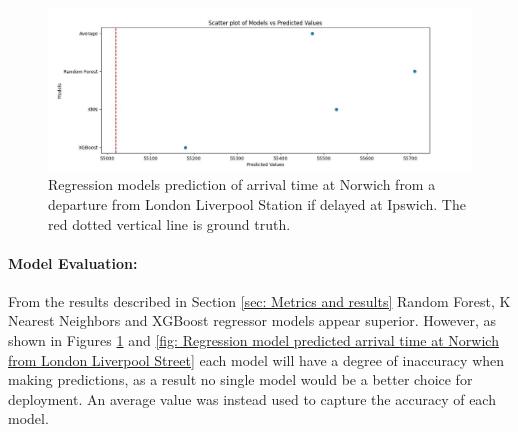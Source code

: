\begin{figure}[hbt!]
    \centering
    \includegraphics[width=\textwidth]{../regression_model/plots/Comparison/Scatter plot of Models vs Predicted Value 55020.jpeg}
    \caption[regression model predictions of previous journeys]{Regression models prediction of arrival time at Norwich from a departure from London Liverpool Station if delayed at Ipswich. The red dotted vertical line is ground truth.}
    \label{fig: inline_Regression models prediction of arrival time at Norwich}
\end{figure}

\paragraph{Model Evaluation:}
From the results described in Section \ref{sec: Metrics and results} Random Forest, K Nearest Neighbors and XGBoost regressor models appear superior. However, as shown in Figures \ref{fig: inline_Regression models prediction of arrival time at Norwich} and \ref{fig: Regression model predicted arrival time at Norwich from London Liverpool Street} each model will have a degree of inaccuracy when making predictions, as a result no single model would be a better choice for deployment. An average value was instead used to capture the accuracy of each model.
